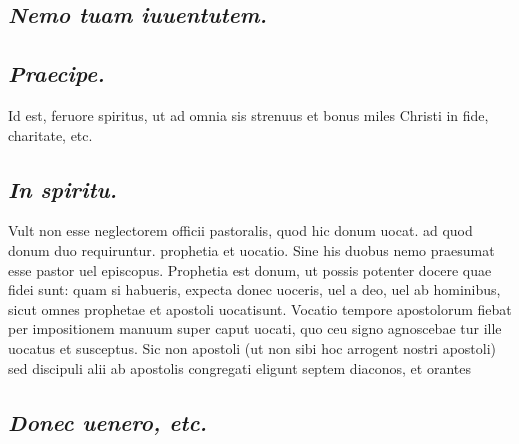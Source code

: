 \documentclass{article}
\begin{document}
\begin{pages}
\subsection*{\textit{Nemo tuam iuuentutem. }}
{}
\subsection*{\textit{Praecipe. }}\pstart Id est, feruore spiritus, ut ad omnia sis strenuus et bonus miles Christi in fide, charitate, etc.  \pend
{}
{}
\subsection*{\textit{In spiritu. }}\pstart Vult non esse neglectorem officii pastoralis, quod hic donum uocat. ad quod donum duo requiruntur. prophetia et uocatio. Sine his duobus nemo praesumat esse pastor uel episcopus. Prophetia est donum, ut possis potenter docere quae fidei sunt: quam si habueris, expecta donec uoceris, uel a deo, uel ab hominibus, sicut omnes prophetae et apostoli uocatisunt. Vocatio tempore apostolorum fiebat per impositionem manuum super caput uocati, quo ceu signo agnoscebae tur ille uocatus et susceptus. Sic non apostoli (ut non sibi hoc arrogent nostri apostoli) sed discipuli alii ab apostolis congregati eligunt septem diaconos, et orantes  \pend
{}
{}
\subsection*{\textit{Donec uenero, etc. }}

\end{pages}
\end{document}
